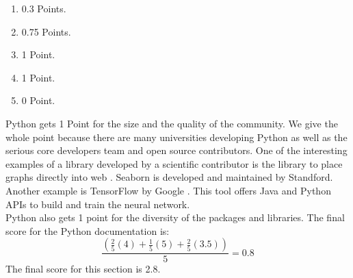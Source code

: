 \documentclass[
  twoside,
  11pt, a4paper,
  footinclude=true,
  headinclude=true,
  cleardoublepage=empty
]{scrreprt}
\begin{document}
    \begin{enumerate}
        \item 0.3 Points.
        \item 0.75 Points.
        \item 1 Point.
        \item 1 Point.
        \item 0 Point.
    \end{enumerate}
    Python gets 1 Point for the size and the quality of the community. We give the whole point because there are many universities developing Python as well as the serious core developers team and open source contributors. One of the interesting examples of a library developed by a scientific contributor is the library to place graphs directly into web \cite{python:Seaborn}. Seaborn is developed and maintained by Standford. Another example is TensorFlow by Google \cite{python:Tensorflow}. This tool offers Java and Python APIs to build and train the neural network.\\
    Python also gets 1 point for the diversity of the packages and libraries.
    The final score for the Python documentation is:
    \[ \frac{(\frac{2}{5}(4) + \frac{1}{5}(5) + \frac{2}{5}(3.5) )}{5}= 0.8\]
    The final score for this section is 2.8. 
    
\end{document}
